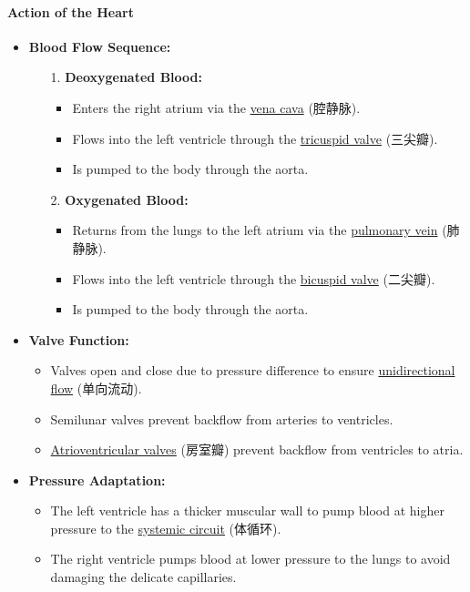 \paragraph{Action of the Heart}
\begin{itemize}
    \item \textbf{Blood Flow Sequence:}
    \begin{itemize}
        \item[1.] \textbf{Deoxygenated Blood:}
        \begin{itemize}
            \item Enters the right atrium via the \underline{vena cava} (腔静脉).
            \item Flows into the left ventricle through the \underline{tricuspid valve} (三尖瓣).
            \item Is pumped to the body through the aorta.
        \end{itemize}
        \item[2.] \textbf{Oxygenated Blood:}
        \begin{itemize}
            \item Returns from the lungs to the left atrium via the \underline{pulmonary vein} (肺静脉).
            \item Flows into the left ventricle through the \underline{bicuspid valve} (二尖瓣).
            \item Is pumped to the body through the aorta.
        \end{itemize}
    \end{itemize}
    \item \textbf{Valve Function:}
    \begin{itemize}
        \item Valves open and close due to pressure difference to ensure \underline{unidirectional flow} (单向流动).
        \item Semilunar valves prevent backflow from arteries to ventricles.
        \item \underline{Atrioventricular valves} (房室瓣) prevent backflow from ventricles to atria.
    \end{itemize}
    \item \textbf{Pressure Adaptation:}
    \begin{itemize}
        \item The left ventricle has a thicker muscular wall to pump blood at higher pressure to the \underline{systemic circuit}
        (体循环).
        \item The right ventricle pumps blood at lower pressure to the lungs to avoid damaging the delicate capillaries.
    \end{itemize}
\end{itemize}

